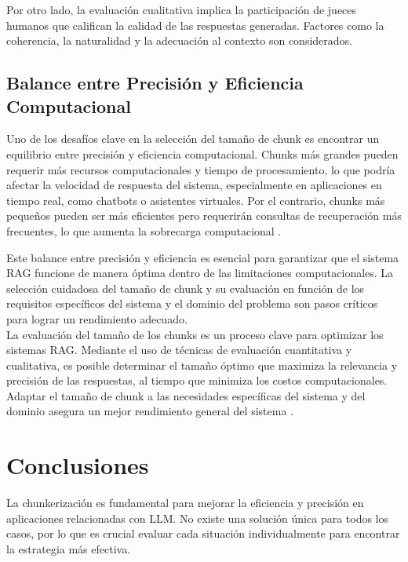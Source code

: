 Por otro lado, la evaluación cualitativa implica la participación de jueces humanos que califican la calidad de las respuestas generadas. Factores como la coherencia, la naturalidad y la adecuación al contexto son considerados.

\subsection{Balance entre Precisión y Eficiencia Computacional}
Uno de los desafíos clave en la selección del tamaño de chunk es encontrar un equilibrio entre precisión y eficiencia computacional. Chunks más grandes pueden requerir más recursos computacionales y tiempo de procesamiento, lo que podría afectar la velocidad de respuesta del sistema, especialmente en aplicaciones en tiempo real, como chatbots o asistentes virtuales. Por el contrario, chunks más pequeños pueden ser más eficientes pero requerirán consultas de recuperación más frecuentes, lo que aumenta la sobrecarga computacional \citep{vectorize-eval}.

Este balance entre precisión y eficiencia es esencial para garantizar que el sistema RAG funcione de manera óptima dentro de las limitaciones computacionales. La selección cuidadosa del tamaño de chunk y su evaluación en función de los requisitos específicos del sistema y el dominio del problema son pasos críticos para lograr un rendimiento adecuado.\\


La evaluación del tamaño de los chunks es un proceso clave para optimizar los sistemas RAG. Mediante el uso de técnicas de evaluación cuantitativa y cualitativa, es posible determinar el tamaño óptimo que maximiza la relevancia y precisión de las respuestas, al tiempo que minimiza los costos computacionales. Adaptar el tamaño de chunk a las necesidades específicas del sistema y del dominio asegura un mejor rendimiento general del sistema \citep{llamaindex-blog,datacamp-eval}.

\section{Conclusiones}
La chunkerización es fundamental para mejorar la eficiencia y precisión en aplicaciones relacionadas con LLM. No existe una solución única para todos los casos, por lo que es crucial evaluar cada situación individualmente para encontrar la estrategia más efectiva.
